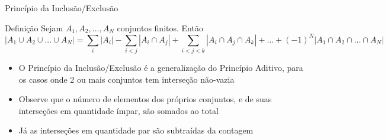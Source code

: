 \begin{frame}[fragile]{Princípio da Inclusão/Exclusão}

    \begin{block}{Definição}
        Sejam $A_1, A_2, \ldots, A_N$ conjuntos finitos. Então
        \[
            | A_1 \cup A_2 \cup ... \cup A_N | = \sum_i | A_i | - \sum_{i<j} | A_i \cap A_j | + \sum_{i<j<k}| A_i \cap A_j \cap A_k | 
                               + \ldots + (-1)^N | A_1 \cap A_2 \cap \ldots \cap A_N |
        \]
    \end{block}

    \vspace{0.2in}

    \begin{itemize}
        \item O Princípio da Inclusão/Exclusão é a generalização do Princípio Aditivo, para os casos onde 2 ou mais conjuntos tem interseção não-vazia

        \item Observe que o número de elementos dos próprios conjuntos, e de suas interseções em quantidade ímpar, são somados ao total

        \item Já as interseções em quantidade par são subtraídas da contagem
    \end{itemize}

\end{frame}

